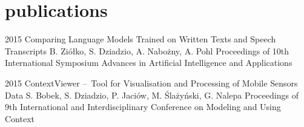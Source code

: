 \documentclass[]{friggeri-cv_osx} %
\begin{document}

\section{publications}

\begin{entrylist}
\entry
{2015}
{Comparing Language Models Trained on Written Texts and Speech Transcripts}
{B. Ziółko, S. Dziadzio, A. Nabożny, A. Pohl}
{Proceedings of 10th International Symposium Advances in Artificial Intelligence and Applications\\}

\entry
{2015}
{ContextViewer – Tool for Visualisation and Processing of Mobile Sensors Data}
{S. Bobek, S. Dziadzio, P. Jaciów, M. Ślażyński, G. Nalepa}
{Proceedings of 9th International and Interdisciplinary Conference on Modeling and Using Context}
\end{entrylist}
\end{document}
